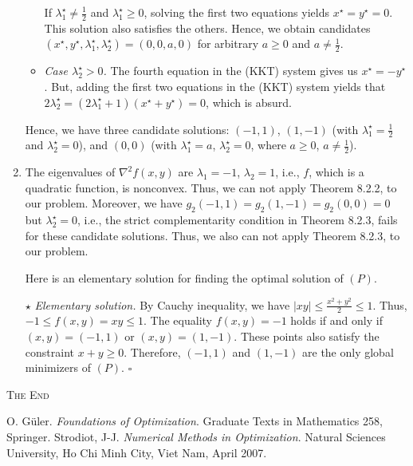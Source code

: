 \documentclass[a4paper]{article}
\numberwithin{equation}{section}
\begin{document}
\begin{enumerate}
\begin{itemize}
If $\lambda _1^\star \ne \frac{1}{2}$ and $\lambda _1^\star \ge 0$, solving the first two equations yields $x^\star =y^\star =0$. This solution also satisfies the others. Hence, we obtain candidates $\left( {{x^\star },{y^\star },\lambda _1^\star ,\lambda _2^\star } \right) = \left( {0,0,a,0} \right)$ for arbitrary $a\ge 0$ and $a\ne \frac{1}{2}$. 
\item \textit{Case $\lambda _2^\star > 0$.} The fourth equation in the (KKT) system gives us $x^\star =-y^\star$. But, adding the first two equations in the (KKT) system yields that $2\lambda _2^\star  = \left( {2\lambda _1^\star  + 1} \right)\left( {{x^\star } + {y^\star }} \right) = 0$, which is absurd. 
\end{itemize}
Hence, we have three candidate solutions: $\left(-1,1\right)$, $\left(1,-1\right)$ (with $\lambda _1^\star =\frac{1}{2}$ and $\lambda _2^\star =0$), and $\left(0,0\right)$ (with $\lambda _1^\star =a$, $\lambda _2^\star =0$, where $a\ge 0$, $a\ne \frac{1}{2}$).
\item The eigenvalues of ${\nabla ^2}f\left( {x,y} \right)$ are $\lambda _1=-1$, $\lambda _2=1$, i.e., $f$, which is a quadratic function, is nonconvex. Thus, we can not apply Theorem 8.2.2, \cite{1} to our problem. Moreover, we have ${g_2}\left( { - 1,1} \right) = {g_2}\left( {1, - 1} \right) = {g_2}\left( {0,0} \right) = 0$ but $\lambda _2^\star =0$, i.e., the strict complementarity condition in Theorem 8.2.3, \cite{1} fails for these candidate solutions. Thus, we also can not apply Theorem 8.2.3, \cite{1} to our problem. 

Here is an elementary solution for finding the optimal solution of $\left(P\right)$.

$\star$ \textit{Elementary solution.} By Cauchy inequality, we have $\left| {xy} \right| \le \frac{{{x^2} + {y^2}}}{2} \le 1$. Thus, $- 1 \le f\left(x,y\right)= xy \le 1$. The equality $f\left(x,y\right)=-1$ holds if and only if $\left(x,y\right)=\left(-1,1\right)$ or $\left(x,y\right)=\left(1,-1\right)$. These points also satisfy the constraint $x+y\ge 0$. Therefore, $\left(-1,1\right)$  and $\left(1,-1\right)$ are the only global minimizers of $\left(P\right)$. \hfill $\square$
\end{enumerate}
\vspace{1cm}
\begin{center}
\textsc{The End}
\end{center}
\newpage
\begin{thebibliography}{999}
 O. G\"{u}ler. \textit{Foundations of Optimization}. Graduate Texts in Mathematics 258, Springer.
 Strodiot, J-J. \textit{Numerical Methods in Optimization}. Natural Sciences University, Ho Chi Minh City, Viet Nam, April 2007.
\end{thebibliography}
\end{document}
